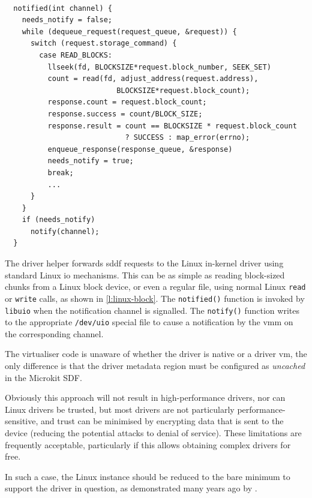 \documentclass[a4paper,12pt]{report}
\newcommand{\code}[1]{\texttt{#1}}
\begin{document}
\begin{lstlisting}[gobble=2,firstline=2,float=th,tabsize=2,
  label={l:linux-block},
  caption={[Example of Linux usermode driver helper.]Example of a
Linux usermode driver helper for a block device accessed via a regular Linux file (simplified).}]

  notified(int channel) {
    needs_notify = false;
    while (dequeue_request(request_queue, &request)) {
      switch (request.storage_command) {
        case READ_BLOCKS:
          llseek(fd, BLOCKSIZE*request.block_number, SEEK_SET)
          count = read(fd, adjust_address(request.address),
                          BLOCKSIZE*request.block_count);
          response.count = request.block_count;
          response.success = count/BLOCK_SIZE;
          response.result = count == BLOCKSIZE * request.block_count
                            ? SUCCESS : map_error(errno);
          enqueue_response(response_queue, &response)
          needs_notify = true;
          break;
          ...
      }
    }
    if (needs_notify)
      notify(channel);
  }
\end{lstlisting}

The driver helper forwards \gls{sddf} requests to the Linux in-kernel
driver using standard Linux \gls{io} mechanisms. This can be as simple
as reading block-sized chunks from a Linux block
device, or even a regular file, using normal Linux
\code{read} or \code{write} calls, as shown in
\autoref{l:linux-block}. The \code{notified()} function is invoked by
\code{libuio} when the notification channel is signalled. The
\code{notify()} function writes to the appropriate \code{/dev/uio}
special file to cause a notification by the \gls{vmm} on the corresponding
channel.

The virtualiser code is unaware of whether the driver is
native or a driver \gls{vm}, the only difference is that the driver metadata
region must be configured as \emph{uncached} in the Microkit SDF.

Obviously this approach will not result in high-performance drivers,
nor can Linux drivers be trusted, but most drivers are not
particularly performance-sensitive, and trust can be minimised by
encrypting data that is sent to the device (reducing the potential
attacks to denial of service). These limitations are frequently
acceptable, particularly if this allows obtaining complex drivers for
free.

In such a case, the Linux instance should be reduced to the bare
minimum to support the driver in question, as
demonstrated many years ago by \citet{LeVasseur_USG_04}.
\end{document}
